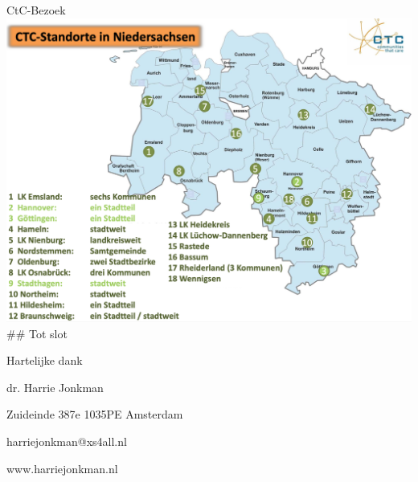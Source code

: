\documentclass[
  ignorenonframetext,
]{beamer}
\begin{document}
\begin{frame}{CtC-Bezoek}
\protect\hypertarget{ctc-bezoek}{}
\includegraphics{images/CTCDL.png} \#\# Tot slot

Hartelijke dank

dr. Harrie Jonkman

Zuideinde 387e 1035PE Amsterdam

harriejonkman@xs4all.nl

www.harriejonkman.nl
\end{frame}
\end{document}
